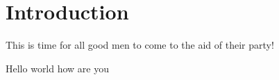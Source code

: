 \section{Introduction}
This is time for all good men to come to the aid of their party!

Hello world how are you


